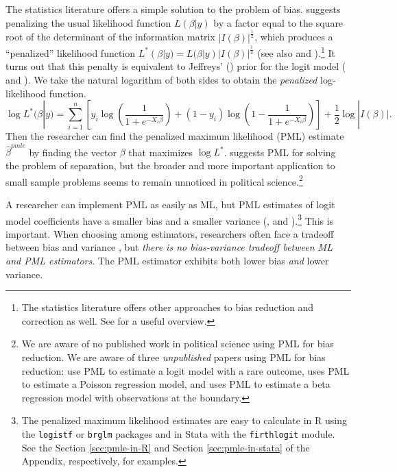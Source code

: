 \documentclass[12pt]{article}
\begin{document}
The statistics literature offers a simple solution to the problem of bias.
\cite{Firth1993} suggests penalizing the usual likelihood function $L(\beta | y)$ by a factor equal to the square root of the determinant of the information matrix $|I(\beta)|^\frac{1}{2}$, which produces a ``penalized'' likelihood function $L^*(\beta | y) = L(\beta | y)|I(\beta)|^\frac{1}{2}$ (see also \citealt{KosmidisFirth2009} and \citealt{Kosmidis2014}).\footnote{The statistics literature offers other approaches to bias reduction and correction as well. 
See \cite{Kosmidis2014} for a useful overview.}
It turns out that this penalty is equivalent to Jeffreys' (\citeyear{Jeffreys1946}) prior for the logit model (\citealt{Firth1993} and \citealt{Poirier1994}).
We take the natural logarithm of both sides to obtain the \textit{penalized} log-likelihood function.
\begin{equation}\nonumber
\log L^*(\beta | y) = \displaystyle \sum_{i = 1}^n \left[y_i \log \left( \dfrac{1}{1 + e^{-X_i\beta}}\right) + (1 - y_i) \log \left(1 - \dfrac{1}{1 + e^{-X_i\beta}}\right)\right] + \dfrac{1}{2} \log |I(\beta)|.
\end{equation}
Then the researcher can find the penalized maximum likelihood (PML) estimate $\hat{\beta}^{pmle}$ by finding the vector $\beta$ that maximizes $\log L^*$.
\cite{Zorn2005} suggests PML for solving the problem of separation,
but the broader and more important application to small sample problems seems to remain unnoticed in political science.\footnote{We are aware of no published work in political science using PML for bias reduction. 
We are aware of three \textit{unpublished} papers using PML for bias reduction: \cite{KaplowGartzke2015} use PML to estimate a logit model with a rare outcome, \cite{Betz2015b} uses PML to estimate a Poisson regression model, and \cite{Betz2015a} uses PML to estimate a beta regression model with observations at the boundary.}

A researcher can implement PML as easily as ML, but PML estimates of logit model coefficients have a smaller bias \citep{Firth1993} and a smaller variance (\citealt[p. 49]{Kosmidis2007}, and \citealt{Copas1988}).\footnote{The penalized maximum likelihood estimates are easy to calculate in R using the \texttt{logistf} or \texttt{brglm} packages and in Stata with the \texttt{firthlogit} module. 
See the Section \ref{sec:pmle-in-R} and Section \ref{sec:pmle-in-stata} of the Appendix, respectively, for examples.}
This is important.
When choosing among estimators, researchers often face a tradeoff between bias and variance \citep[pp. 37-38]{HastieTibshiraniFriedman2013}, but \textit{there is no bias-variance tradeoff between ML and PML estimators}.
The PML estimator exhibits both lower bias \textit{and} lower variance.
\end{document}
